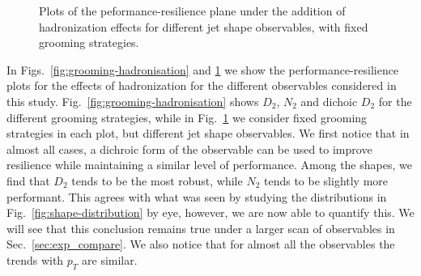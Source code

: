 \documentclass[11pt,letterpaper]{article}
\DeclareRobustCommand{\Sec}[1]{Sec.~\ref{#1}}
\DeclareRobustCommand{\Fig}[1]{Fig.~\ref{#1}}
\DeclareRobustCommand{\Figs}[2]{Figs.~\ref{#1} and \ref{#2}}
\begin{document}
\begin{figure}
  \caption{Plots of the peformance-resilience plane under the addition of hadronization effects for different jet shape observables, with fixed grooming strategies.}\label{fig:shapes-hadronisation}
\end{figure}


In \Figs{fig:grooming-hadronisation}{fig:shapes-hadronisation} we show the performance-resilience plots for the effects of hadronization for the different observables considered in this study. \Fig{fig:grooming-hadronisation} shows $D_2$, $N_2$ and dichoic $D_2$ for the different grooming strategies, while in \Fig{fig:shapes-hadronisation} we consider fixed grooming strategies in each plot, but different jet shape observables. We first notice that in almost all cases, a dichroic form of the observable can be used to improve resilience while maintaining a similar level of performance. Among the shapes, we find that $D_2$ tends to be the most robust, while $N_2$ tends to be slightly more performant. This agrees with what was seen by studying the distributions in \Fig{fig:shape-distribution} by eye, however, we are now able to quantify this. We will see that this conclusion remains true under a larger scan of observables in \Sec{sec:exp_compare}. We also notice that for almost all the observables the trends with $p_T$ are similar.
\end{document}
